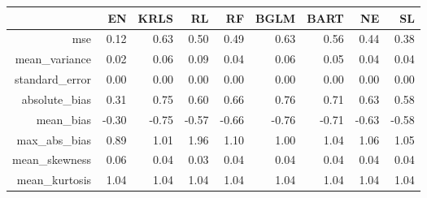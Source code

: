 \begin{table}[ht]
\centering
\begin{tabular}{rrrrrrrrr}
  \hline
 & EN & KRLS & RL & RF & BGLM & BART & NE & SL \\ 
  \hline
mse & 0.12 & 0.63 & 0.50 & 0.49 & 0.63 & 0.56 & 0.44 & 0.38 \\ 
  mean\_variance & 0.02 & 0.06 & 0.09 & 0.04 & 0.06 & 0.05 & 0.04 & 0.04 \\ 
  standard\_error & 0.00 & 0.00 & 0.00 & 0.00 & 0.00 & 0.00 & 0.00 & 0.00 \\ 
  absolute\_bias & 0.31 & 0.75 & 0.60 & 0.66 & 0.76 & 0.71 & 0.63 & 0.58 \\ 
  mean\_bias & -0.30 & -0.75 & -0.57 & -0.66 & -0.76 & -0.71 & -0.63 & -0.58 \\ 
  max\_abs\_bias & 0.89 & 1.01 & 1.96 & 1.10 & 1.00 & 1.04 & 1.06 & 1.05 \\ 
  mean\_skewness & 0.06 & 0.04 & 0.03 & 0.04 & 0.04 & 0.04 & 0.04 & 0.04 \\ 
  mean\_kurtosis & 1.04 & 1.04 & 1.04 & 1.04 & 1.04 & 1.04 & 1.04 & 1.04 \\ 
   \hline
\end{tabular}
\end{table}
